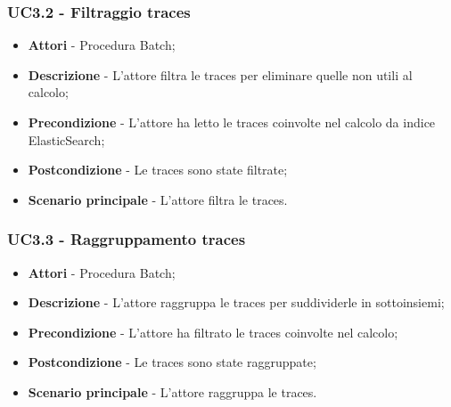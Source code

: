                 \subsubsection{UC3.2 - Filtraggio traces}


                    \begin{itemize}

                        \item \textbf{Attori} - Procedura Batch;
                        \item \textbf{Descrizione} - L'attore filtra le traces per eliminare quelle non utili al calcolo;
                        \item \textbf{Precondizione} - L'attore ha letto le traces coinvolte nel calcolo da indice ElasticSearch;
                        \item \textbf{Postcondizione} - Le traces sono state filtrate;
                        \item \textbf{Scenario principale} - L'attore filtra le traces.

                    \end{itemize}

                \subsubsection{UC3.3 - Raggruppamento traces}


                    \begin{itemize}

                        \item \textbf{Attori} - Procedura Batch;
                        \item \textbf{Descrizione} - L'attore raggruppa le traces per suddividerle in sottoinsiemi;
                        \item \textbf{Precondizione} - L'attore ha filtrato le traces coinvolte nel calcolo;
                        \item \textbf{Postcondizione} - Le traces sono state raggruppate;
                        \item \textbf{Scenario principale} - L'attore raggruppa le traces.

                    \end{itemize}

